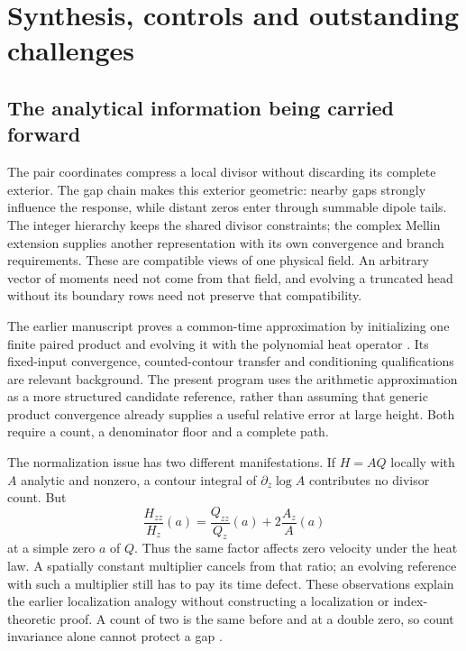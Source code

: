 \section{Synthesis, controls and outstanding challenges}
\label{sec:program}

\subsection{The analytical information being carried forward}

The pair coordinates compress a local divisor without discarding its
complete exterior. The gap chain makes this exterior geometric: nearby
gaps strongly influence the response, while distant zeros enter through
summable dipole tails. The integer hierarchy keeps the shared divisor
constraints; the complex Mellin extension supplies another representation
with its own convergence and branch requirements. These are compatible
views of one physical field. An arbitrary vector of moments need not
come from that field, and evolving a truncated head without its boundary
rows need not preserve that compatibility.

The earlier manuscript proves a common-time approximation by initializing
one finite paired product and evolving it with the polynomial heat
operator \cite[\S\S6--8]{VCDCMManuscript}. Its fixed-input convergence,
counted-contour transfer and conditioning qualifications are relevant
background. The present program uses the arithmetic approximation as a
more structured candidate reference, rather than assuming that generic
product convergence already supplies a useful relative error at large
height. Both require a count, a denominator floor and a complete path.

The normalization issue has two different manifestations. If
$H=AQ$ locally with $A$ analytic and nonzero, a contour integral of
$\partial_z\log A$ contributes no divisor count. But
\[
 \frac{H_{zz}}{H_z}(a)
   =\frac{Q_{zz}}{Q_z}(a)+2\frac{A_z}{A}(a)
\]
at a simple zero $a$ of $Q$. Thus the same factor affects zero velocity
under the heat law. A spatially constant multiplier cancels from that
ratio; an evolving reference with such a multiplier still has to pay
its time defect. These observations explain the earlier localization
analogy without constructing a localization or index-theoretic proof.
A count of two is the same before and at a double zero, so count
invariance alone cannot protect a gap
\cite{VCDCMDiscussion07,VCDCMDiscussion08}.

